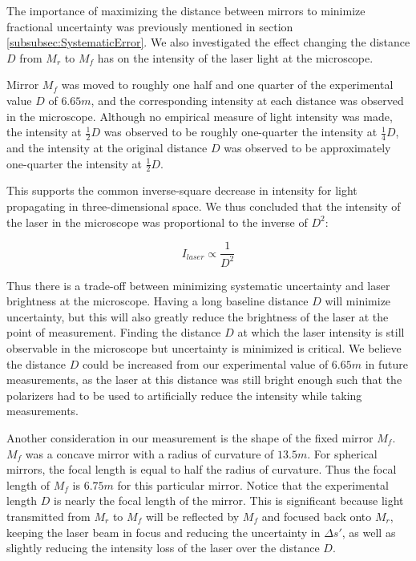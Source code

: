 \documentclass[twocolumn]{article}
\begin{document}
		The importance of maximizing the distance between mirrors to minimize fractional uncertainty was previously mentioned in section \ref{subsubsec:SystematicError}.
		We also investigated the effect changing the distance $D$ from $M_r$ to $M_f$ has on the intensity of the laser light at the microscope.
		
		Mirror $M_f$ was moved to roughly one half and one quarter of the experimental value $D$ of $6.65m$, and the corresponding intensity at each distance was observed in the microscope. Although no empirical measure of light intensity was made, the intensity at $\frac{1}{2}D$ was observed to be roughly one-quarter the intensity at $\frac{1}{4}D$, and the intensity at the original distance $D$ was observed to be approximately one-quarter the intensity at $\frac{1}{2}D$.
		
		This supports the common inverse-square decrease in intensity for light propagating in three-dimensional space.
		We thus concluded that the intensity of the laser in the microscope was proportional to the inverse of $D^2$:
		
		\begin{equation}
			I_{laser} \propto \frac{1}{D^2}
		\end{equation}
		
		Thus there is a trade-off between minimizing systematic uncertainty and laser brightness at the microscope.
		Having a long baseline distance $D$ will minimize uncertainty, but this will also greatly reduce the brightness of the laser at the point of measurement.
		Finding the distance $D$ at which the laser intensity is still observable in the microscope but uncertainty is minimized is critical.
		We believe the distance $D$ could be increased from our experimental value of $6.65m$ in future measurements, as the laser at this distance was still bright enough such that the polarizers had to be used to artificially reduce the intensity while taking measurements.
		
		Another consideration in our measurement is the shape of the fixed mirror $M_f$. 
		$M_f$ was a concave mirror with a radius of curvature of $13.5m$. 
		For spherical mirrors, the focal length is equal to half the radius of curvature. 
		Thus the focal length of $M_f$ is $6.75m$ for this particular mirror. 
		Notice that the experimental length $D$ is nearly the focal length of the mirror.
		This is significant because light transmitted from $M_r$ to $M_f$ will be reflected by $M_f$ and focused back onto $M_r$, keeping the laser beam in focus and reducing the uncertainty in $\Delta s'$, as well as slightly reducing the intensity loss of the laser over the distance $D$.
		
\end{document}
